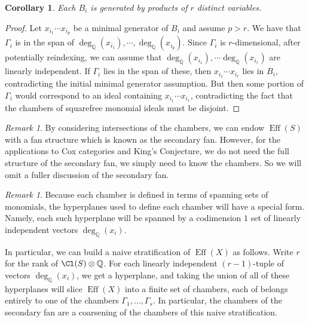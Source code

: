 \documentclass[11pt]{amsart}
\numberwithin{equation}{section}
\newtheorem{cor}[equation]{Corollary}
\theoremstyle{definition}
\theoremstyle{remark}
\newtheorem{remark}[equation]{Remark}
\newcommand{\QQ}{\mathbb Q}
\newcommand{\Eff}{\operatorname{Eff}}
\begin{document}
\begin{cor}
Each $B_i$ is generated by products of $r$ distinct variables.
\end{cor}
\begin{proof}
    Let $x_{i_1}\cdots x_{i_p}$ be a minimal generator of $B_i$ and assume $p>r$.  We have that $\Gamma_i$ is in the span of $\deg_{\QQ}(x_{i_1}), \cdots, \deg_{\QQ}(x_{i_p})$.   Since $\Gamma_i$ is $r$-dimensional, after potentially reindexing, we can assume that $\deg_{\QQ}(x_{i_1}), \cdots \deg_{\QQ}(x_{i_r})$ are linearly independent.  If $\Gamma_i$ lies in the span of these, then $x_{i_1}\cdots x_{i_r}$ lies in $B_i$, contradicting the initial minimal generator assumption.  But then some portion of $\Gamma_i$ would correspond to an ideal containing $x_{i_1}\cdots x_{i_r}$, contradicting the fact that the chambers of squarefree monomial ideals must be disjoint.
\end{proof}
\begin{remark}
By considering intersections of the chambers, we can endow $\Eff(S)$ with a fan structure which is known as the secondary fan.  However, for the applications to Cox categories and King's Conjecture, we do not need the full structure of the secondary fan, we simply need to know the chambers.  So we will omit a fuller discussion of the secondary fan.
\end{remark}
\begin{remark}
    Because each chamber is defined in terms of spanning sets of monomials, the hyperplanes used to define each chamber will have a special form.  Namely, each such hyperplane will be spanned by a codimension $1$ set of linearly independent vectors $\deg_{\QQ}(x_i)$.  
    
    In particular, we can build a naive stratification of $\Eff(X)$ as follows.  Write $r$ for the rank of $\Cl(S)\otimes \QQ$.  For each linearly independent $(r-1)$-tuple of vectors $\deg_{\QQ}(x_i)$, we get a hyperplane, and taking the union of all of these hyperplanes will slice $\Eff(X)$ into a finite set of chambers, each of belongs entirely to one of the chambers $\Gamma_1,\dots, \Gamma_s$.  In particular, the chambers of the secondary fan are a coarsening of the chambers of this naive stratification.
\end{remark}
\end{document}

